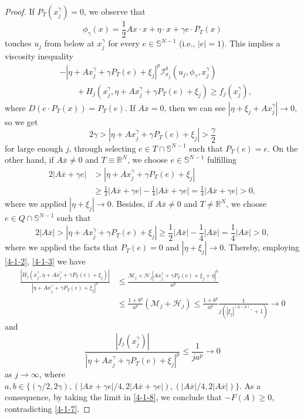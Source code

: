 \documentclass[11pt,reqno]{amsart}
\numberwithin{equation}{section}
\begin{document}
\begin{proof}
If $P_T(x^\gamma_j)=0$, we observe that
$$
\phi_\gamma(x)=\frac{1}{2}Ax\cdot x+\eta\cdot x+\gamma e\cdot P_T(x)
$$
touches $u_j$ from below at $x^\gamma_j$ for every $e\in \mathbb{S}^{N-1}$ (i.e., $|e|=1$). This implies a viscosity inequality
\begin{equation}
\label{4-1-8}
\begin{split}
&-|\eta+Ax^\gamma_j+\gamma P_T(e)+\xi_j|^p\mathcal{I}^\delta_{\sigma_j}(u_j,\phi_\gamma,x^\gamma_j)\\
&\qquad+H_j(x_j^\gamma,\eta+Ax^\gamma_j+\gamma P_T(e)+\xi_j)\ge f_j(x^\gamma_j),
\end{split}
\end{equation}
where $D(e\cdot P_T(x))=P_T(e)$. If $A\overline{x}=0$, then we can see $|\eta+\xi_j+Ax^\gamma_j|\rightarrow0$, so we get
\begin{equation*}
2\gamma>|\eta+Ax^\gamma_j+\gamma P_T(e)+\xi_j|>\frac{\gamma}{2}
\end{equation*}
for large enough $j$, through selecting $e\in T\cap \mathbb{S}^{N-1}$ such that $P_T(e)=e$.
On the other hand, if $A\overline{x}\neq0$ and $T\equiv \mathbb{R}^N$, we choose $e\in \mathbb{S}^{N-1}$ fulfilling
\begin{align*}
2|A\overline{x}+\gamma e|
&>|\eta+Ax^\gamma_j+\gamma P_T(e)+\xi_j|\\
&\ge\frac{1}{2}|A\overline{x}+\gamma e|-\frac{1}{4}|A\overline{x}+\gamma e|
=\frac{1}{4}|A\overline{x}+\gamma e|>0,
\end{align*}
where we applied $|\eta+\xi_j|\rightarrow0$.
Besides, if $A\overline{x}\neq0$ and $T\neq\mathbb{R}^N$, we choose $e\in Q\cap \mathbb{S}^{N-1}$ such that
$$
2|A\overline{x}|>|\eta+Ax^\gamma_j+\gamma P_T(e)+\xi_j|\ge\frac{1}{2}|A\overline{x}|-\frac{1}{4}|A\overline{x}|=\frac{1}{4}|A\overline{x}|>0,
$$
where we applied the facts that $P_T(e)=0$ and $|\eta+\xi_j|\rightarrow0$. Thereby, employing \eqref{4-1-2}, \eqref{4-1-3} we have
\begin{align*}
\frac{|H_j(x^\gamma_j,\eta+Ax^\gamma_j+\gamma P_T(e)+\xi_j)|}{|\eta+Ax^\gamma_j+\gamma P_T(e)+\xi_j|^p}&\le \frac{\mathcal{M}_j+\mathcal{H}_j|Ax^\gamma_j+\gamma P_T(e)+\xi_j+\eta|^q}{a^p}\\
&\le \frac{1+b^q}{a^p}(\mathcal{M}_j+\mathcal{H}_j)\le\frac{1+b^q}{a^p}\frac{1}{j(|\xi_j|^{(q-p)_+}+1)}\rightarrow0
\end{align*}
and
$$
\frac{|f_j(x^\gamma_j)|}{|\eta+Ax^\gamma_j+\gamma P_T(e)+\xi_j|^p}\le\frac{1}{ja^p}\rightarrow0
$$
as $j\rightarrow\infty$, where $a,b\in\{(\gamma/2,2\gamma),(|A\overline{x}+\gamma e|/4,2|A\overline{x}+\gamma e|),(|A\overline{x}|/4,2|A\overline{x}|)\}$. As a consequence, by taking the limit in \eqref{4-1-8}, we conclude that $-F(A)\ge0$, contradicting \eqref{4-1-7}.


\end{proof}
\end{document}
